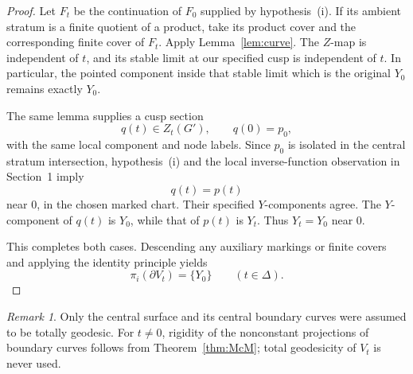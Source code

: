 \documentclass[11pt]{article}
\newcommand{\D}{\Delta}
\theoremstyle{remark}
\newtheorem{remark}[theorem]{Remark}
\begin{document}
\begin{proof}
Let \(F_t\) be the continuation of \(F_0\) supplied by
hypothesis~(i). If its ambient stratum is a finite quotient
of a product, take its product cover and the corresponding
finite cover of \(F_t\). Apply Lemma~\ref{lem:curve}.
The \(Z\)-map is independent of \(t\), and its stable limit
at our specified cusp is independent of \(t\).
In particular, the pointed component inside that stable
limit which is the original \(Y_0\) remains exactly \(Y_0\).

The same lemma supplies a cusp section
\[
q(t)\in Z_t(G'),
\qquad q(0)=p_0,
\]
with the same local component and node labels.
Since \(p_0\) is isolated in the central stratum intersection,
hypothesis~(i) and the local inverse-function observation in
Section~1 imply
\[
q(t)=p(t)
\]
near \(0\), in the chosen marked chart.
Their specified \(Y\)-components agree. The \(Y\)-component
of \(q(t)\) is \(Y_0\), while that of \(p(t)\) is \(Y_t\).
Thus \(Y_t=Y_0\) near \(0\).

This completes both cases. Descending any auxiliary markings
or finite covers and applying the identity principle yields
\[
\pi_i(\partial V_t)=\{Y_0\}
\qquad(t\in\D).
\]
\end{proof}

\begin{remark}
Only the central surface and its central boundary curves were
assumed to be totally geodesic. For \(t\ne0\), rigidity of the
nonconstant projections of boundary curves follows from
Theorem~\ref{thm:McM}; total geodesicity of \(V_t\) is never
used.
\end{remark}
\end{document}

